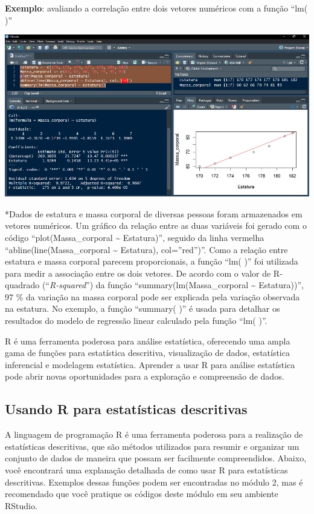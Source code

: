 \documentclass[
]{book}
\begin{document}
\textbf{Exemplo}: avaliando a correlação entre dois vetores numéricos com a função ``lm( )''

\includegraphics{images/clipboard-870011745.png}

*Dados de estatura e massa corporal de diversas pessoas foram armazenados em vetores numéricos. Um gráfico da relação entre as duas variáveis foi gerado com o código ``plot(Massa\_corporal \textasciitilde{} Estatura)'', seguido da linha vermelha ``abline(line(Massa\_corporal \textasciitilde{} Estatura), col=''red'')''. Como a relação entre estatura e massa corporal parecem proporcionais, a função ``lm( )'' foi utilizada para medir a associação entre os dois vetores. De acordo com o valor de R-quadrado (``\emph{R-squared}'') da função ``summary(lm(Massa\_corporal \textasciitilde{} Estatura))'', 97 \% da variação na massa corporal pode ser explicada pela variação observada na estatura. No exemplo, a função ``summary( )'' é usada para detalhar os resultados do modelo de regressão linear calculado pela função ``lm( )''.

R é uma ferramenta poderosa para análise estatística, oferecendo uma ampla gama de funções para estatística descritiva, visualização de dados, estatística inferencial e modelagem estatística. Aprender a usar R para análise estatística pode abrir novas oportunidades para a exploração e compreensão de dados.

\subsection{Usando R para estatísticas descritivas}\label{usando-r-para-estatuxedsticas-descritivas}

A linguagem de programação R é uma ferramenta poderosa para a realização de estatísticas descritivas, que são métodos utilizados para resumir e organizar um conjunto de dados de maneira que possam ser facilmente compreendidos. Abaixo, você encontrará uma explanação detalhada de como usar R para estatísticas descritivas. Exemplos dessas funções podem ser encontradas no módulo 2, mas é recomendado que você pratique os códigos deste módulo em seu ambiente RStudio.
\end{document}
